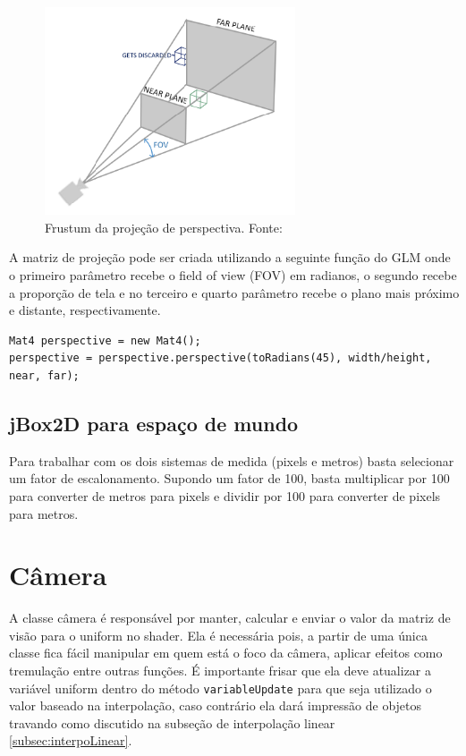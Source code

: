 \documentclass[12pt, 
openright, 
oneside, 
a4paper,    
brazil]{facom-ufu-abntex2}
\begin{document}
\begin{figure}[H]
	\centering
	\includegraphics[width=20em]{imagens/perspectiveProjection.png}
	\caption{Frustum da projeção de perspectiva. Fonte:~\cite{LearnOpenGL}}
\end{figure}

A matriz de projeção pode ser criada utilizando a seguinte função do GLM onde o primeiro parâmetro recebe o field of view (FOV) em radianos, o segundo recebe a proporção de tela e no terceiro e quarto parâmetro recebe o plano mais próximo e distante, respectivamente.

\begin{lstlisting}[caption=Função Perspective do GLM]
Mat4 perspective = new Mat4();
perspective = perspective.perspective(toRadians(45), width/height, near, far);
\end{lstlisting}

\subsection{jBox2D para espaço de mundo}

Para trabalhar com os dois sistemas de medida (pixels e metros) basta selecionar um fator de escalonamento. Supondo um fator de 100, basta multiplicar por 100 para converter de metros para pixels e dividir por 100 para converter de pixels para metros.

\section{Câmera}
A classe câmera é responsável por manter, calcular e enviar o valor da matriz de visão para o uniform no shader. Ela é necessária pois, a partir de uma única classe fica fácil manipular em quem está o foco da câmera, aplicar efeitos como tremulação entre outras funções. É importante frisar que ela deve atualizar a variável uniform dentro do método \texttt{variableUpdate} para que seja utilizado o valor baseado na interpolação, caso contrário ela dará impressão de objetos travando como discutido na subseção de interpolação linear \ref{subsec:interpoLinear}.
\end{document}
